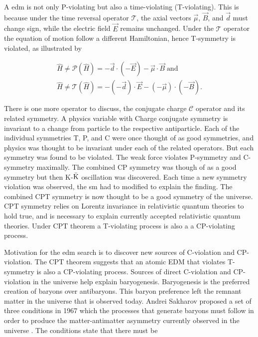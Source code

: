 A \gls{edm} is not only P-violating but also a time-violating (T-violating). This is because under the time reversal operator $\mathcal T$, the axial vectors $\vec{\mu}$, $\vec{B}$, and $\vec{d}$ must change sign, while the electric field $\vec{E}$ remains unchanged. Under the $\mathcal{T}$ operator the equation of motion follow a different Hamiltonian, hence T-symmetry is violated, as illustrated by

\begin{equation} \label{eq:PVedm}
\begin{split}
     \hat{H} \neq \mathcal{P}(\hat{H}) = -\vec{d} \cdot (-\vec{E}) - \vec{\mu} \cdot \vec{B} \; \textrm{and} \\
    \hat{H} \neq \mathcal{T}(\hat{H})= -(-\vec{d}) \cdot \vec{E} - (-\vec{\mu}) \cdot (-\vec{B}). 
\end{split}
\end{equation}

There is one more operator to discuss, the conjugate charge $\mathcal{C}$ operator and its related symmetry. A physics variable with Charge conjugate symmetry is invariant to a change from particle to the respective antiparticle. Each of the individual symmetries T, P, and C were once thought of as good symmetries, and physics was thought to be invariant under each of the related operators. But each symmetry was found to be violated. The weak force violates P-symmetry and C-symmetry maximally. The combined CP symmetry was though of as a good symmetry but then K-$\bar{\textrm K}$ oscillation was discovered. Each time a new symmetry violation was observed, the \gls{sm} had to modified to explain the finding. The combined CPT symmetry is now thought to be a good symmetry of the universe. CPT symmetry relies on Lorentz invariance in relativistic quantum theories to hold true, and is necessary to explain currently accepted relativistic quantum theories. Under CPT theorem a T-violating process is also a a CP-violating process. 

Motivation for the \gls{edm} search is to discover new sources of C-violation and CP-violation. The CPT theorem suggests that an atomic EDM that violates T-symmetry is also a CP-violating process. Sources of direct C-violation and CP-violation in the universe help explain baryogenesis. Baryogenesis is the preferred creation of baryons over antibaryons. This baryon preference left the remnant matter in the universe that is observed today. Andrei Sakharov proposed a set of three conditions in 1967 which the processes that generate baryons must follow in order to produce the matter-antimatter asymmetry currently observed in the universe \cite{Sakharov}. The conditions state that there must be

